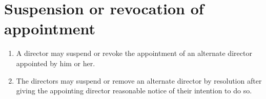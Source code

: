 \section{Suspension or revocation of appointment}

\begin{enumerate}[label=(\alph*)]
    \item A director may suspend or revoke the appointment of an alternate director appointed by him or her.
    
    \item The directors may suspend or remove an alternate director by resolution after giving the appointing director reasonable notice of their intention to do so.
\end{enumerate} 